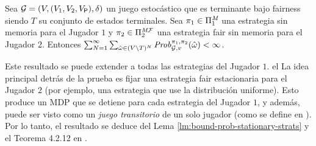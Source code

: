 \begin{lemma}\label{lm:bound-prob-stationary-strats}
  Sea $\mathcal{G} = (V, (V_1, V_2, V_{\mathsf{P}}), \delta)$ un juego estocástico que es terminante bajo fairness siendo $T$ su conjunto de estados terminales.
  Sea $\pi_{1} \in \Pi^{\textit{M}}_{1}$ una estrategia sin memoria para
  el Jugador $1$ y $\pi_{2} \in \Pi^{\textit{M}\mathcal{F}}_{2}$ una
  estrategia fair sin memoria para el Jugador $2$.  Entonces
  $\sum^\infty_{N=1} \sum_{\hat{\omega} \in (V \setminus T)^{N}} \mathit{Prob}^{\pi_{1}, \pi_{2}}_{\mathcal{G},v}(\hat{\omega}) < \infty$.
\end{lemma}

Este resultado se puede extender a todas las estrategias del Jugador $1$. el
La idea principal detrás de la prueba es fijar una estrategia fair estacionaria para
el Jugador $2$ (por ejemplo, una estrategia que use la distribución uniforme). Esto produce un MDP
que se detiene para cada estrategia del Jugador $1$, y además, puede ser
visto como un \emph{juego transitorio} de un solo jugador (como se define en
\cite{FilarV96}). Por lo tanto, el resultado se deduce del Lema
\ref{lm:bound-prob-stationary-strats} y el Teorema 4.2.12 en
\cite{FilarV96}.

